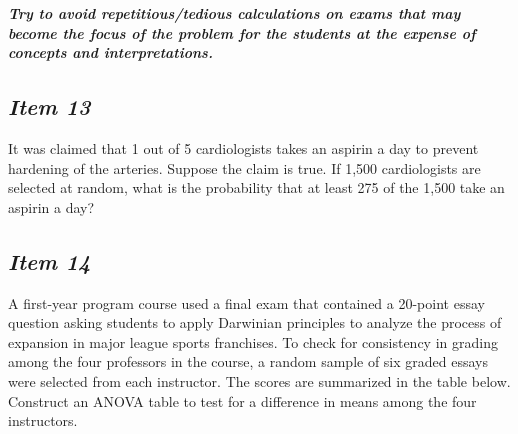\noindent\textbf{\textit{Try to avoid repetitious/tedious calculations on exams that may become the focus of the problem for the students at the expense of concepts and interpretations.}}





\subsection{\textbf{\textit{Item 13}}}


It was claimed 
that 1 out of 5 cardiologists takes an aspirin a day to prevent hardening of the arteries. Suppose the claim is true. If 1,500 cardiologists are selected at random, what is the probability that at least 275 of the 1,500 take an aspirin a day? 





\subsection{\textbf{\textit{Item 14}}}





A first-year program course 
%
used a final exam that contained a 20-point essay question asking students to apply Darwinian principles to analyze the process of expansion in major league sports franchises. To check for consistency in grading among the four professors in the course, a random sample of six graded essays were selected from each instructor. The scores are summarized in the table below. Construct an ANOVA table to test for a difference in means among the four instructors. 








